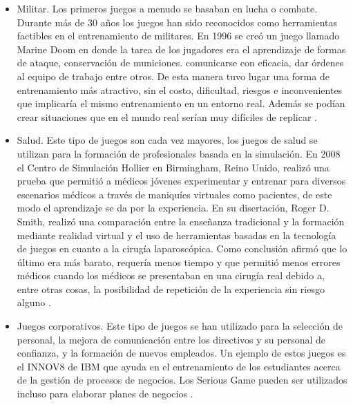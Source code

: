 \begin{itemize}
\item Militar. Los primeros juegos a menudo se basaban en lucha o combate. Durante más de 30 años los juegos han sido reconocidos como herramientas factibles en el entrenamiento de militares. En 1996 se creó un juego llamado Marine Doom en donde la tarea de los jugadores era el aprendizaje de formas de ataque, conservación de municiones. comunicarse con eficacia, dar órdenes al equipo de trabajo entre otros. De esta manera tuvo lugar una forma de entrenamiento más atractivo, sin el costo, dificultad, riesgos e inconvenientes que implicaría el mismo entrenamiento en un entorno real. Además se podían crear situaciones que en el mundo real serían muy difíciles de replicar \cite{education:games}.

\item Salud. Este tipo de juegos son cada vez mayores, los juegos de salud se utilizan para la formación de profesionales basada en la simulación. En 2008 el Centro de Simulación Hollier en Birmingham, Reino Unido, realizó una prueba que permitió a médicos jóvenes experimentar y entrenar para diversos escenarios médicos a través de maniquíes virtuales como pacientes, de este modo el aprendizaje se da por la experiencia. En su disertación, Roger D. Smith, realizó una comparación entre la enseñanza tradicional y la formación mediante realidad virtual y el uso de herramientas basadas en la tecnología de juegos en cuanto a la cirugía laparoscópica. Como conclusión afirmó que lo último era más barato, requería menos tiempo y que permitió menos errores médicos cuando los médicos se presentaban en una cirugía real debido a, entre otras cosas, la posibilidad de repetición de la experiencia sin riesgo alguno \cite{education:games}.

\item Juegos corporativos. Este tipo de juegos se han utilizado para la selección de personal, la mejora de comunicación entre los directivos y su personal de confianza, y la formación de nuevos empleados. Un ejemplo de estos juegos es el INNOV8 de IBM que ayuda en el entrenamiento de los estudiantes acerca de la gestión de procesos de negocios. Los Serious Game pueden ser utilizados incluso para elaborar planes de negocios \cite{education:games}. 

\end{itemize}


